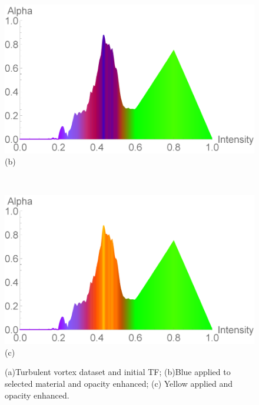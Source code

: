 \documentclass[twoside,twocolumn,10pt]{article}
\begin{document}
\begin{figure}
	\begin{minipage}{.16\textwidth}
		\centering
		\includegraphics[width=.91\linewidth]{tf_vortex_2_blue}
		(b)%
		\label{fig:tf_vortex_2_blue}
	\end{minipage}~
	\begin{minipage}{.16\textwidth}
		\centering
		\includegraphics[width=.91\linewidth]{tf_vortex_2_yellow}
		(c)%
		\label{fig:tf_vortex_2_yellow}
	\end{minipage}
	\caption{(a)Turbulent vortex dataset and initial TF; (b)Blue applied to selected material and opacity enhanced; (c) Yellow applied and opacity enhanced.}
	\label{fig:Vortex_all}
\end{figure}
\end{document}

